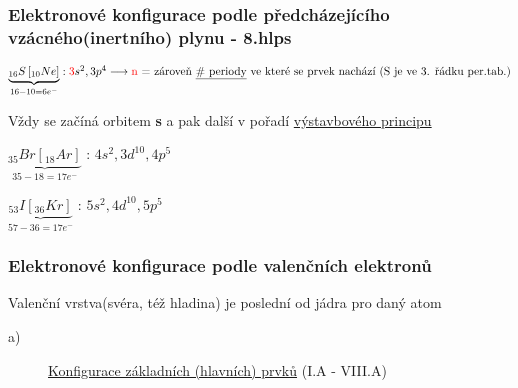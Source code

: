 \subsubsection[Zápis se vzácným plynem]{Elektronové konfigurace podle předcházejícího vzácného(inertního) plynu - 8.hlps}
\(\underbrace{_{16}S\left[_{10}Ne\right]}_{16 - 10 = 6e^-}: \textcolor{red}{3}s^2, 3p^4 \longrightarrow 
    \mbox{\textcolor{red}{n} = zároveň \underline{\# periody} ve které se prvek nachází (S je ve 3. řádku per.tab.)}
\)

\vspace{1em}
Vždy se začíná orbitem \textbf{s} a pak další v pořadí \hyperlink{vystavbovyprincip}{výstavbového principu}

\vspace{2em}
$\underbrace{_{35}Br\left[_{18}Ar\right]}_{35 - 18 = 17e^-}$ : $4s^2, 3d^{10}, 4p^5$

\vspace{2em}
$\underbrace{_{53}I\left[_{36}Kr\right]}_{57 - 36 = 17e^-}$ : $5s^2, 4d^{10}, 5p^5$

\subsubsection{Elektronové konfigurace podle valenčních elektronů}
Valenční vrstva(svéra, též hladina) je poslední od jádra pro daný atom

\begin{description}
    \item[a)] \underline{Konfigurace základních (hlavních) prvků} (I.A - VIII.A)
\end{description}